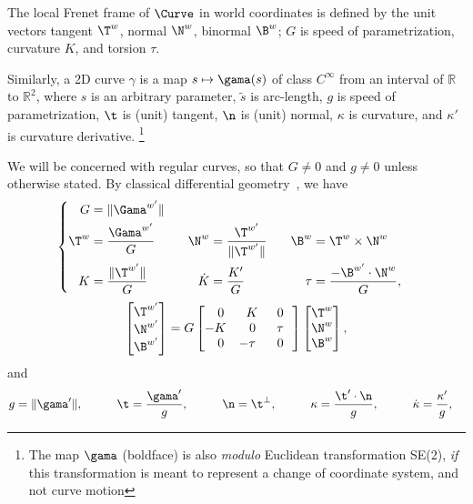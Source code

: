 The local Frenet frame of $\Curve$ in world coordinates is defined by the unit
vectors tangent $\T^w$, normal $\N^w$, binormal $\B^w$; $G$ is speed of
parametrization, curvature $K$, and torsion $\tau$. 

Similarly, a 2D curve $\gamma$ is a map $s \mapsto \gama(s)$ of class
$C^\infty$ from an interval of $\mathbb{R}$ to $\mathbb{R}^2$, where $s$ is an arbitrary parameter, $\tilde s$
is arc-length, $g$ is speed of parametrization,
$\t$ is (unit) tangent, $\n$ is (unit) normal, $\kappa$ is curvature, and $\kappa'$ is curvature derivative.
\footnote{The map $\gama$ (boldface) is also \emph{modulo} Euclidean
transformation SE(2), \emph{if} this transformation is meant to represent a change of
coordinate system, and not curve motion}

We will be concerned with regular curves, so that $G\neq 0$ and $g\neq 0$ unless
otherwise stated.
By classical differential geometry~\cite{Carmo:Diff:Geom}, we have
\begin{equation}\label{eq:TNB}
\left\{
\begin{aligned}
G  &= \|\Gama^{w'}\|  \\
\T^w &= \frac{\Gama^{w'}}{G}  &\hspace{3mm}
\N^w &= \frac{\T^{w'}}{\|\T^{w'}\|}  &\hspace{3mm}
\B^w &= \T^w \times \N^w \\
K  &= \frac{\|\T^{w'}\|}{G}  &
\dot{K} &= \frac{K'}{G}  &
\tau &= \frac{-\B^{w'}\cdot\N^w}{G},
\end{aligned}\right.
\end{equation} 
\begin{equation}
\begin{bmatrix}
\T^{w'}\\
\N^{w'}\\
\B^{w'}
\end{bmatrix} = 
G
\begin{bmatrix}
\hfill 0\,   & \hfill K &\,\,\, 0\ \  \\
-K & \hfill 0 \, &\,\,\, \tau\ \ \\
\hfill 0\, & -\tau\, &\,\,\, 0\ \ 
\end{bmatrix}
\begin{bmatrix}
\T^w\\
\N^w\\
\B^w
\end{bmatrix},\label{eq:frenet:explicit}
\end{equation}
and
\begin{equation}\label{eq:frenet2D:explicit}
\begin{aligned}
g  &= \|\gama'\|, &\hspace{7mm}
\t &= \frac{\gama'}{g}, &\hspace{7mm}
\n &= \t^\perp, &\hspace{7mm}
\kappa &= \frac{\t'\cdot \n}{g}, &\hspace{7mm}
\dot \kappa &= \frac{\kappa'}{g},
\end{aligned}
\end{equation} 
